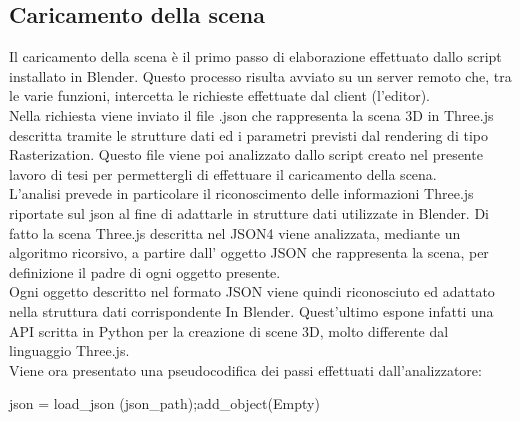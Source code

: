 \subsection{Caricamento della scena}
\label{sec:chapter_baking_service_pipeline_baking_caricam_scena}
Il caricamento della scena è il primo passo di elaborazione effettuato dallo script installato in Blender. Questo processo risulta avviato su un server remoto che, tra le varie funzioni, intercetta le richieste effettuate dal client (l’editor).
\\
Nella richiesta viene inviato il file .json che rappresenta la scena 3D in Three.js descritta tramite le strutture dati ed i parametri previsti dal rendering di tipo Rasterization.
Questo file viene poi analizzato dallo script creato nel presente lavoro di tesi per permettergli di effettuare il caricamento della scena.
\\
L’analisi prevede in particolare il riconoscimento  delle informazioni Three.js riportate sul json al fine di adattarle in strutture dati utilizzate in Blender.
Di fatto la scena Three.js descritta nel JSON4 viene analizzata, mediante un algoritmo ricorsivo, a partire dall’ oggetto JSON che rappresenta la scena, per definizione il padre di ogni oggetto presente.
\\
Ogni oggetto descritto nel formato JSON viene quindi riconosciuto ed adattato nella struttura dati corrispondente In Blender. Quest’ultimo espone infatti una API scritta in Python per la creazione di scene 3D, molto differente dal linguaggio Three.js.
\\
Viene ora presentato una pseudocodifica dei passi effettuati dall’analizzatore:
\\
\begin{algorithm}
	json = load\_json (json\_path);\hspace{5pt}add\_object(Empty)\;
\end{algorithm}
